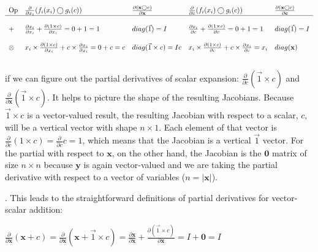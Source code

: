 \documentclass[11pt]{article}
\begin{document}
$
\begin{array}{llllll}
\text{Op} & \frac{\partial}{\partial x_i} ( f_i(x_i) \bigcirc g_i(c) ) & \frac{\partial (\mathbf{x}  \bigcirc c)}{\partial \mathbf{x}} & \frac{\partial}{\partial c} ( f_i(x_i) \bigcirc g_i(c) ) & \frac{\partial (\mathbf{x} \bigcirc c)}{\partial \mathbf{c}}\\

\hline\\

+ & \frac{\partial x_i}{\partial x_i} + \frac{\partial (1 \times c)}{\partial x_i} = 0 + 1 = 1 & diag(\vec{1}) = I & \frac{\partial x_i}{\partial c} + \frac{\partial (1 \times c)}{\partial c} = 0 + 1 = 1& diag(\vec{1}) = I\\\\

\otimes & x_i \times \frac{\partial (1 \times c)}{\partial x_i} + c \times \frac{\partial x_i}{\partial x_i} = 0 + c = c & diag(\vec{1} \times c) = Ic & x_i \times \frac{\partial (1 \times c)}{\partial c} + c \times \frac{\partial x_i}{\partial c} = x_i& diag(\mathbf{x})\\\\

\end{array}
$ 


 if we can figure out the partial derivatives of scalar expansion: $\frac{\partial}{\partial c} (\vec{1} \times c)$ and $\frac{\partial}{\partial \mathbf{x}} (\vec{1} \times c)$. It helps to picture the shape of the resulting Jacobians. Because $\vec{1} \times c$ is a vector-valued result, the resulting Jacobian with respect to a scalar, $c$, will be a vertical vector with shape $n \times 1$. Each element of that vector is $\frac{\partial}{\partial c}(1 \times c) = \frac{\partial}{\partial c} c = 1$, which means that the Jacobian is a vertical $\vec{1}$ vector. For the partial with respect to $\mathbf{x}$, on the other hand, the Jacobian is the $\mathbf{0}$ matrix of size $n \times n$ because $\mathbf{y}$ is again vector-valued and we are taking the partial derivative with respect to a vector of variables ($n = |\mathbf{x}|$).

. This leads to the straightforward definitions of partial derivatives for vector-scalar addition:

$\frac{\partial}{\partial \mathbf{x}} ( \mathbf{x} + c ) = \frac{\partial}{\partial \mathbf{x}} ( \mathbf{x} + \vec{1} \times c ) = \frac{\partial \mathbf{x}}{\partial \mathbf{x}} + \frac{\partial (\vec{1} \times c)}{\partial \mathbf{x}} = I + \mathbf{0} = I$
\end{document}
